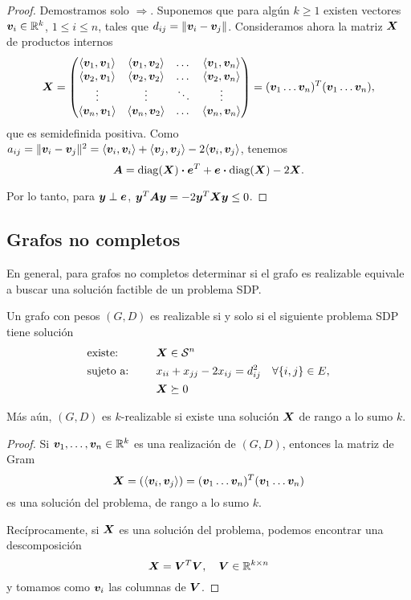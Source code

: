 \begin{proof}
Demostramos solo $\Rightarrow$.
Suponemos que para algún $k \ge 1$ existen vectores $\bm{v}_i \in \mathbb{R}^k$, $1 \le i \le n$, tales que $d_{ij} = \|\bm{v}_i - \bm{v}_j\|$. Consideramos ahora la matriz $\bm{X}$ de productos internos
$$
\Xb = \begin{pmatrix}
\innerl{\vb_1}{\vb_1} & \innerl{\vb_1}{\vb_2} & \dots & \innerl{\vb_1}{\vb_n} \\
\innerl{\vb_2}{\vb_1} & \innerl{\vb_2}{\vb_2} & \dots & \innerl{\vb_2}{\vb_n} \\
\vdots & \vdots & \ddots & \vdots \\
\innerl{\vb_n}{\vb_1} & \innerl{\vb_n}{\vb_2} & \dots & \innerl{\vb_n}{\vb_n}
\end{pmatrix} = (\vb_1 \dots \vb_n)^T (\vb_1 \dots \vb_n),
$$
que es semidefinida positiva. Como $a_{ij} = \| \bm{v}_i - \bm{v}_j\|^2 = \langle \bm{v}_i, \bm{v}_i \rangle + \langle \bm{v}_j, \bm{v}_j \rangle - 2 \langle \bm{v}_i, \bm{v}_j \rangle$, tenemos
$$
\bm{A} = \operatorname{diag}(\bm{X}) \boldsymbol{\cdot} \bm{e}^T + \bm{e} \boldsymbol{\cdot} \operatorname{diag}(\bm{X}) - 2 \bm{X}.
$$

Por lo tanto, para $\bm{y} \perp \bm{e}$, $\bm{y}^T \bm{A} \bm{y} = -2 \bm{y}^T \bm{X} \bm{y} \le 0$.

\end{proof}

\subsection{Grafos no completos}

En general, para grafos no completos determinar si el grafo es realizable equivale a buscar una solución factible de un problema SDP.

\begin{theorem}
Un grafo con pesos $(G, D)$ es realizable si y solo si el siguiente problema SDP tiene solución
\begin{alignat*}{2}
  & \text{existe: } & & \bm{X} \in {\mathcal S}^n \\
   & \text{sujeto a: } & \quad & x_{ii} + x_{jj} - 2 x_{ij} = d_{ij}^2 \quad \forall \{i, j\} \in E, \\
   &&& \bm{X}  \succeq 0
\end{alignat*}

Más aún, $(G, D)$ es $k$-realizable si existe una solución $\bm{X}$ de rango a lo sumo $k$.
\end{theorem}

\begin{proof}
Si $\bm{v}_1, \dots, \bm{v}_n \in \mathbb{R}^k$ es una realización de $(G, D)$, entonces la matriz de Gram
$$
\Xb = (\innerl{\vb_i}{\vb_j}) = (\vb_1 \dots \vb_n)^T (\vb_1 \dots \vb_n)
$$
es una solución del problema, de rango a lo sumo $k$.

Recíprocamente, si $\bm{X}$ es una solución del problema, podemos encontrar una descomposición
$$
\bm{X} = \bm{V}^T \bm{V}, \quad \bm{V} \in \mathbb{R}^{k \times n}
$$
y tomamos como $\bm{v}_i$ las columnas de $\bm{V}$.
\end{proof}

